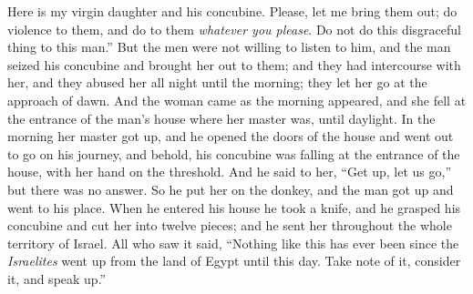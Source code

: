 \begin{biblechapter}
\verse Here is my virgin daughter and his concubine. Please, let me bring them out; do violence to them, and do to them \textit{whatever you please}. Do not do this disgraceful thing to this man.”
\verse But the men were not willing to listen to him, and the man seized his concubine and brought her out to them; and they had intercourse with her, and they abused her all night until the morning; they let her go at the approach of dawn.
\verse And the woman came as the morning appeared, and she fell at the entrance of the man’s house where her master was, until daylight.
\verse In the morning her master got up, and he opened the doors of the house and went out to go on his journey, and behold, his concubine was falling at the entrance of the house, with her hand on the threshold.
\verse And he said to her, “Get up, let us go,” but there was no answer. So he put her on the donkey, and the man got up and went to his place.
\verse When he entered his house he took a knife, and he grasped his concubine and cut her into twelve pieces; and he sent her throughout the whole territory of Israel.
\verse All who saw it said, “Nothing like this has ever been since the \textit{Israelites} went up from the land of Egypt until this day. Take note of it, consider it, and speak up.”
\end{biblechapter}

